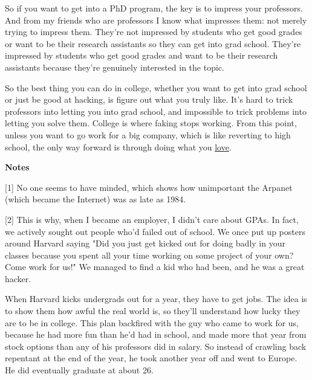 So
                    if you want to get into a PhD program, the key is to impress
                    your professors. And from my friends who are professors I
                    know what impresses them: not merely trying to impress them.
                    They're not impressed by students who get good grades or
                    want to be their research assistants so they can get into
                    grad school. They're impressed by students who get good
                    grades and want to be their research assistants because
                    they're genuinely interested in the topic.

So the
                    best thing you can do in college, whether you want to get
                    into grad school or just be good at hacking, is figure out
                    what you truly like. It's hard to trick professors into
                    letting you into grad school, and impossible to trick
                    problems into letting you solve them. College is where
                    faking stops working. From this point, unless you want to go
                    work for a big company, which is like reverting to high
                    school, the only way forward is through doing what you
                    \href{http://www.paulgraham.com/love.html}{love}.





\textbf{Notes}


                    [1] No one seems to have minded, which shows how unimportant
                    the Arpanet (which became the Internet) was as late as
                    1984.

[2] This is why, when I became an employer,
                    I didn't care about GPAs. In fact, we actively sought out
                    people who'd failed out of school. We once put up posters
                    around Harvard saying "Did you just get kicked out for doing
                    badly in your classes because you spent all your time
                    working on some project of your own? Come work for us!" We
                    managed to find a kid who had been, and he was a great
                    hacker.

When Harvard kicks undergrads out for a
                    year, they have to get jobs. The idea is to show them how
                    awful the real world is, so they'll understand how lucky
                    they are to be in college. This plan backfired with the guy
                    who came to work for us, because he had more fun than he'd
                    had in school, and made more that year from stock options
                    than any of his professors did in salary. So instead of
                    crawling back repentant at the end of the year, he took
                    another year off and went to Europe. He did eventually
                    graduate at about 26.

